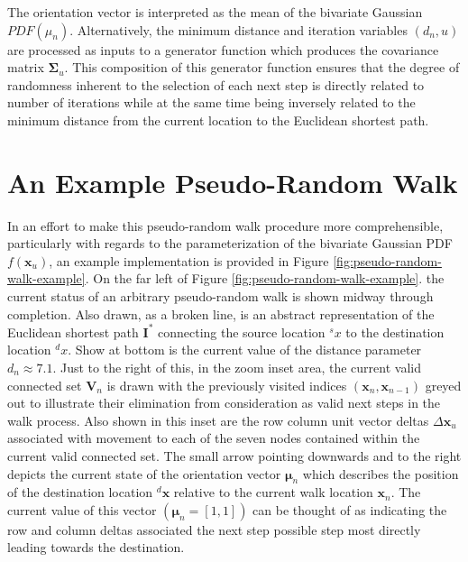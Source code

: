The orientation vector is interpreted as the mean of the bivariate Gaussian $PDF(\mu_n)$. Alternatively, the minimum distance and iteration variables $(d_n ,u)$ are processed as inputs to a generator function which produces the covariance matrix $\boldsymbol{\Sigma}_u$. This composition of this generator function ensures that the degree of randomness inherent to the selection of each next step is directly related to number of iterations while at the same time being inversely related to the minimum distance from the current location to the Euclidean shortest path.
            
\section{An Example Pseudo-Random Walk}

In an effort to make this pseudo-random walk procedure more comprehensible, particularly with regards to the parameterization of the bivariate Gaussian PDF $f(\textbf{x}_u)$, an example implementation is provided in Figure \ref{fig:pseudo-random-walk-example}. On the far left of Figure \ref{fig:pseudo-random-walk-example}. the current status of an arbitrary pseudo-random walk is shown midway through completion. Also drawn, as a broken line, is an abstract representation of the Euclidean shortest path $\textbf{I}^*$ connecting the source location ${}^{s}x$ to the destination location ${}^{d}x$. Show at bottom is the current value of the distance parameter $d_n \approx 7.1$. Just to the right of this, in the zoom inset area, the current valid connected set $\textbf{V}_n$ is drawn with the previously visited indices $(\textbf{x}_n ,\textbf{x}_{n-1})$ greyed out to illustrate their elimination from consideration as valid next steps in the walk process. Also shown in this inset are the row column unit vector deltas $\Delta\textbf{x}_u$ associated with movement to each of the seven nodes contained within the current valid connected set. The small arrow pointing downwards and to the right depicts the current state of the orientation vector $\boldsymbol\mu_n$ which describes the position of the destination location ${}^{d}\textbf{x}$ relative to the current walk location $\textbf{x}_n$. The current value of this vector $(\boldsymbol\mu_n = [1,1])$ can be thought of as indicating the row and column deltas associated the next step possible step most directly leading towards the destination.
            
